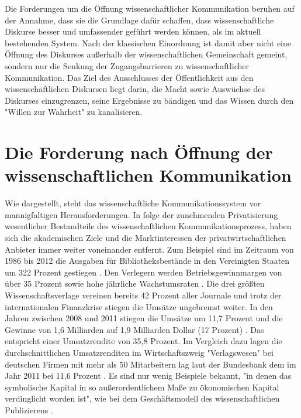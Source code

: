Die Forderungen um die Öffnung wissenschaftlicher Kommunikation beruhen auf der Annahme, dass sie die Grundlage dafür schaffen, dass wissenschaftliche Diskurse besser und umfassender geführt werden können, als im aktuell bestehenden System. Nach der klassischen Einordnung ist damit aber nicht eine Öffnung des Diskurses außerhalb der wissenschaftlichen Gemeinschaft gemeint, sondern nur die Senkung der Zugangsbarrieren zu wissenschaftlicher Kommunikation. Das Ziel des Ausschlusses der Öffentlichkeit aus den wissenschaftlichen Diskursen liegt darin, die Macht sowie Auswüchse des Diskurses einzugrenzen, seine Ergebnisse zu bändigen und das Wissen durch den "Willen zur Wahrheit" \cite[:15]{foucault_1991_ordnung} zu kanalisieren.

\section{Die Forderung nach Öffnung der wissenschaftlichen Kommunikation}

Wie dargestellt, steht das wissenschaftliche Kommunikationssystem vor mannigfaltigen Herausforderungen. In folge der zunehmenden Privatisierung wesentlicher Bestandteile des wissenschaftlichen Kommunikationsprozess, haben sich die akademischen Ziele und die Marktinteressen der privatwirtschaftlichen Anbieter immer weiter voneinander entfernt. Zum Beispiel sind im Zeitraum von 1986 bis 2012 die Ausgaben für Bibliotheksbestände in den Vereinigten Staaten um 322 Prozent gestiegen \cite{lewis_2015_future}. Den Verlegern werden Betriebsgewinnmargen von über 35 Prozent \cite{russell_2008_business} \cite{cope2014future} sowie hohe jährliche Wachstumsraten \cite{Martin_2013} \cite{Wellcome_Trust_2003}. Die drei größten Wissenschaftsverlage vereinen bereits 42 Prozent aller Journale und trotz der internationalen Finanzkrise stiegen die Umsätze ungebremst weiter. In den Jahren zwischen 2008 und 2011 stiegen die Umsätze um 11,7 Prozent und die Gewinne von 1,6 Milliarden auf 1,9 Milliarden Dollar (17 Prozent) \cite{cope2014future}. Das entspricht einer Umsatzrendite von 35,8 Prozent. Im Vergleich dazu lagen die durchschnittlichen Umsatzrenditen im Wirtschaftszweig "Verlagswesen" bei deutschen Firmen mit mehr als 50 Mitarbeitern lag laut der Bundesbank dem im Jahr 2011 bei 11,6 Prozent \cite{bundesbank_2014}. Es sind nur wenig Beispiele bekannt, "in denen das symbolische Kapital in so außerordentlichem Maße zu ökonomischen Kapital verdinglicht worden ist", wie bei dem Geschäftsmodell des wissenschaftlichen Publizierens \cite{hagner_2015_sache_buches}.


